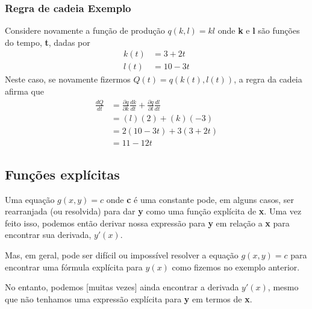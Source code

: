 \documentclass[a4paper]{article}
\begin{document}
\subsubsection*{Regra de cadeia Exemplo}
Considere novamente a função de produção $q(k,l) = kl$ onde \textbf{k} e \textbf{l} são funções do tempo, \textbf{t}, dadas por
\begin{equation}
    \begin{split}        
        k(t) & = 3 + 2t \\
        l(t) & = 10 - 3t
    \end{split}
\end{equation}
Neste caso, se novamente fizermos $Q(t) = q(k(t),l(t))$, a regra da cadeia afirma que
\begin{equation}
    \begin{split}        
        \frac{dQ}{dt} & = \frac{\partial q}{\partial k}\frac{dk}{dt} + \frac{\partial q}{\partial l}\frac{dl}{dt} \\
        & = (l)(2) + (k)(-3) \\
        & = 2(10 - 3t) + 3(3 + 2t) \\
        & = 11 - 12t
    \end{split}
\end{equation}
\subsection{Funções explícitas}
Uma equação $g(x,y)=c$ onde \textbf{c} é uma constante pode, em alguns casos, ser rearranjada (ou resolvida) para dar \textbf{y} como uma função explícita de \textbf{x}. Uma vez feito isso, podemos então derivar nossa expressão para \textbf{y} em relação a \textbf{x} para encontrar sua derivada, $y'(x)$.
\par Mas, em geral, pode ser difícil ou impossível resolver a equação $g(x,y) = c$ para encontrar uma fórmula explícita para $y(x)$ como fizemos no exemplo anterior.

No entanto, podemos [muitas vezes] ainda encontrar a derivada $y'(x)$, mesmo que não tenhamos uma expressão explícita para \textbf{y} em termos de \textbf{x}.
\end{document}
